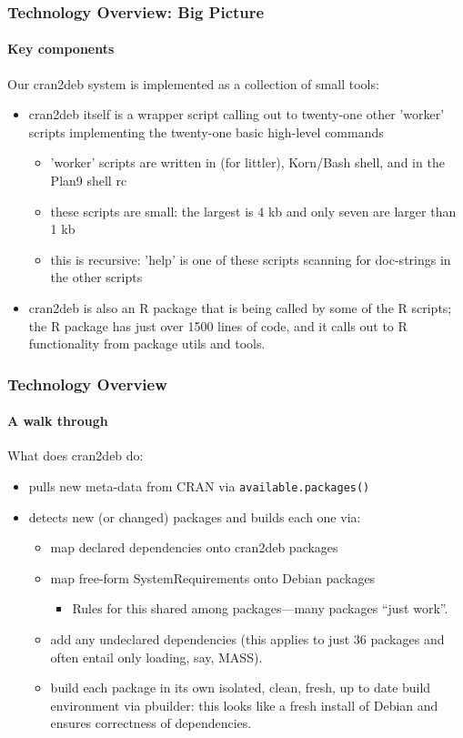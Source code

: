 \documentclass[smaller,compress]{beamer}
\begin{document}
\begin{frame}
  \frametitle{Technology Overview: Big Picture}
  \framesubtitle{Key components}

  Our cran2deb system is implemented as a collection of small tools:
  \begin{itemize}
  \item cran2deb itself is a wrapper script calling out to twenty-one other
    'worker' scripts implementing the twenty-one basic high-level commands
    \begin{itemize}
    \item 'worker' scripts are written in \R (for littler), Korn/Bash shell,
      and in the Plan9 shell rc
    \item these scripts are small: the largest is 4 kb and only seven
      are larger than 1 kb
    \item this is recursive: 'help' is one of these scripts scanning for
      doc-strings in the other scripts
    \end{itemize}
  \item cran2deb is also an R package that is being called by some of the R
    scripts; the R package has just over 1500 lines of code, and it calls out
    to R functionality from package utils and tools.
  \end{itemize}
\end{frame}  

\begin{frame}
  \frametitle{Technology Overview} 
  \framesubtitle{A walk through}

  What does cran2deb do:
  \begin{itemize}
  \item pulls new meta-data from CRAN via \texttt{available.packages()}
  \item detects new (or changed) packages and builds each one via:
    \begin{itemize}
    \item map declared \R dependencies onto cran2deb packages
    \item map free-form SystemRequirements onto Debian packages
      \begin{itemize}
      \item Rules for this shared among packages---many packages ``just work''.
      \end{itemize}
    \item add any undeclared dependencies (this applies to just 36 packages
      and often entail only loading, say, MASS).
    \item build each package in its own isolated, clean, fresh, up to date
      build environment via pbuilder: this looks like a fresh install of
      Debian and ensures correctness of dependencies. 
    \end{itemize}
  \end{itemize}
\end{frame}  
\end{document}
